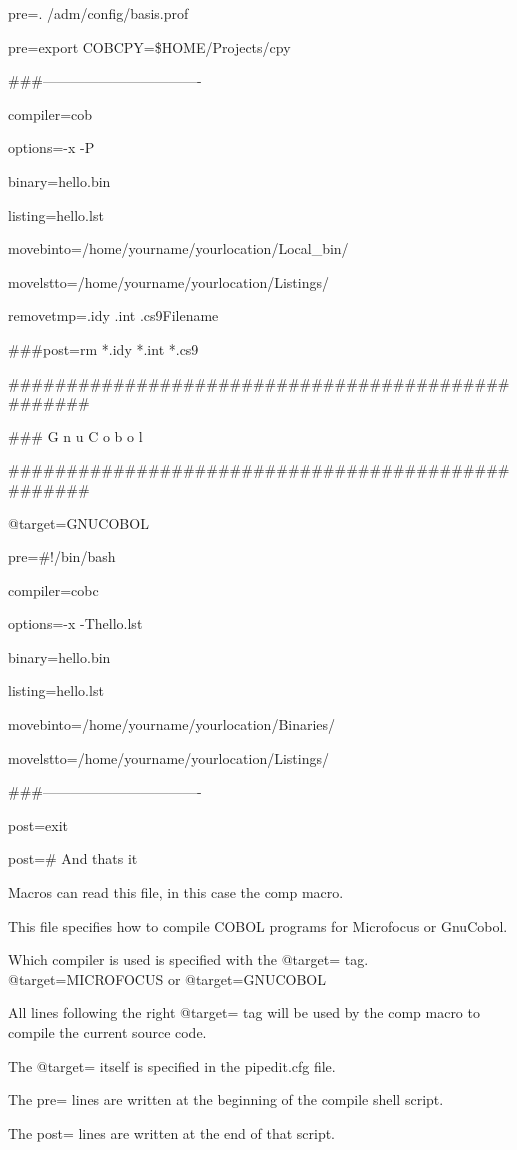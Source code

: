 \documentclass{report}
\begin{document}
pre=. /adm/config/basis.prof

pre=export COBCPY=\$HOME/Projects/cpy

\#\#\#----------------------------------

compiler=cob

options=-x -P

binary=hello.bin

listing=hello.lst

movebinto=/home/yourname/yourlocation/Local\_bin/

movelstto=/home/yourname/yourlocation/Listings/

removetmp=.idy .int .cs9Filename

\#\#\#post=rm *.idy *.int *.cs9

\#\#\#\#\#\#\#\#\#\#\#\#\#\#\#\#\#\#\#\#\#\#\#\#\#\#\#\#\#\#\#\#\#\#\#\#\#\#\#\#\#\#\#\#\#\#\#\#\#\#

\#\#\# G n u C o b o l 

\#\#\#\#\#\#\#\#\#\#\#\#\#\#\#\#\#\#\#\#\#\#\#\#\#\#\#\#\#\#\#\#\#\#\#\#\#\#\#\#\#\#\#\#\#\#\#\#\#\#

@target=GNUCOBOL

pre=\#!/bin/bash

compiler=cobc

options=-x -Thello.lst

binary=hello.bin

listing=hello.lst

movebinto=/home/yourname/yourlocation/Binaries/

movelstto=/home/yourname/yourlocation/Listings/

\#\#\#----------------------------------

post=exit

post=\# And thats it


Macros can read this file, in this case the comp macro.

This file specifies how to compile COBOL programs for Microfocus or GnuCobol.

Which compiler is used is specified with the @target= tag.
@target=MICROFOCUS 		or
@target=GNUCOBOL

All lines following the right @target= tag will be used by the comp macro to compile the current source code.

The @target= itself is specified in the pipedit.cfg file.

The pre= lines are written at the beginning of the compile shell script.

The post= lines are written at the end of that script.
\end{document}
